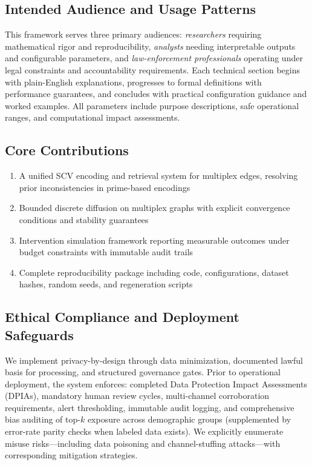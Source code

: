 \documentclass[12pt]{article}
\theoremstyle{plain}
\begin{document}
\subsection*{Intended Audience and Usage Patterns}
This framework serves three primary audiences: \emph{researchers} requiring mathematical rigor and reproducibility, \emph{analysts} needing interpretable outputs and configurable parameters, and \emph{law-enforcement professionals} operating under legal constraints and accountability requirements. Each technical section begins with plain-English explanations, progresses to formal definitions with performance guarantees, and concludes with practical configuration guidance and worked examples. All parameters include purpose descriptions, safe operational ranges, and computational impact assessments.

\subsection*{Core Contributions}
\begin{enumerate}
  \item A unified SCV encoding and retrieval system for multiplex edges, resolving prior inconsistencies in prime-based encodings
  \item Bounded discrete diffusion on multiplex graphs with explicit convergence conditions and stability guarantees
  \item Intervention simulation framework reporting measurable outcomes under budget constraints with immutable audit trails
  \item Complete reproducibility package including code, configurations, dataset hashes, random seeds, and regeneration scripts
\end{enumerate}

\subsection*{Ethical Compliance and Deployment Safeguards}
We implement privacy-by-design through data minimization, documented lawful basis for processing, and structured governance gates. Prior to operational deployment, the system enforces: completed Data Protection Impact Assessments (DPIAs), mandatory human review cycles, multi-channel corroboration requirements, alert thresholding, immutable audit logging, and comprehensive bias auditing of top-$k$ exposure across demographic groups (supplemented by error-rate parity checks when labeled data exists). We explicitly enumerate misuse risks—including data poisoning and channel-stuffing attacks—with corresponding mitigation strategies.
\end{document}
